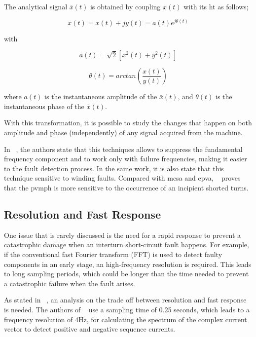 The analytical signal $ \bar{x}(t) $ is obtained by coupling $x(t)$ with its \acrshort{ht} as follows;

\begin{equation} \label{eq:analytical_function}
    \bar{x}(t) = x(t) + jy(t) = a(t)e^{j\theta (t)}
\end{equation}

\noindent with

\begin{equation} \label{eq:analytical_function_a}
    a(t) = \sqrt{2}{ [ x^2(t) + y^2(t) ]}
\end{equation}

\begin{equation} \label{eq:analytical_function_a}
    \theta(t) = arctan\left (\frac{x(t)}{y(t)} \right)
\end{equation}

where $a(t)$ is the instantaneous amplitude of the $\bar{x}(t)$, and $\theta(t)$ is the instantaneous phase of the $\bar{x}(t)$.

With this transformation, it is possible to study the changes that happen on both amplitude and phase (independently) of any signal acquired from the machine.

In ~\cite{Kia2013}, the authors state that this techniques allows to suppress the fundamental frequency component and to work only with failure frequencies, making it easier to the fault detection process. In the same work, it is also state that this technique  sensitive to winding faults. Compared with \acrshort{mcsa} and \acrshort{epva}, ~\cite{Kia2013} proves that the \acrshort{pvmph} is more sensitive to the occurrence of an incipient shorted turns.

\subsection{Resolution and Fast Response} %
\label{subsec:resolution_fast_response}

One issue that is rarely discussed is the need for a rapid response to prevent a catastrophic damage when an interturn short-circuit fault happens. For example, if the conventional fast Fourier transform (FFT) is used to detect faulty components in an early stage, an high-frequency resolution is required. This leads to long sampling periods, which could be longer than the time needed to prevent a catastrophic failure when the fault arises. 

As stated in ~\cite{Cheng2011}, an analysis on the trade off between resolution and fast response is needed. The authors of ~\cite{Cheng2011} use a sampling time of 0.25 seconds, which leads to a frequency resolution of 4Hz, for calculating the spectrum of the complex current vector to detect positive and negative sequence currents.

